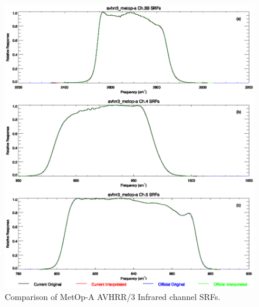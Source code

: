\begin{figure}[htp]
  \centering
  \includegraphics[scale=1]{graphics/nominal/avhrr3_metop-a.srf.eps}
  \caption{Comparison of MetOp-A AVHRR/3 Infrared channel SRFs.}
  \label{fig:avhrr3_metop-a}
\end{figure}

